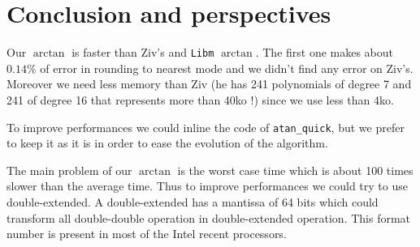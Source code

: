 \section{Conclusion and perspectives}

Our $\arctan$ is faster than Ziv's and \texttt{Libm} $\arctan$.
The first one makes about $0.14\%$ of error in rounding
to nearest mode and we didn't find any error on Ziv's. Moreover we need
less memory than Ziv (he has 241 polynomials of degree 7 and 241 of degree
16 that represents more than 40ko !) since we use less than 4ko.

To improve performances we could inline the code of \texttt{atan\_quick},
but we prefer to keep it as it is in order to ease the evolution of the
algorithm.

The main problem of our $\arctan$ is the worst case time which is about 100
times slower than the average time. Thus to improve performances we could
try to use double-extended. A double-extended has a mantissa of 64 bits
which could transform all double-double operation in double-extended
operation. This format number is present in most of the Intel recent
processors.
